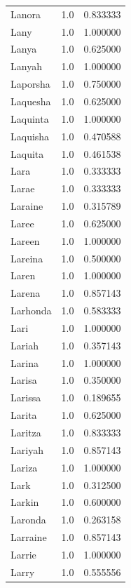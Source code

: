\documentclass[
  letterpaper,
  DIV=11,
  numbers=noendperiod]{scrreprt}
\begin{document}
\begin{tabular}{lrr}
Lanora          &   1.0 &   0.833333 \\
Lany            &   1.0 &   1.000000 \\
Lanya           &   1.0 &   0.625000 \\
Lanyah          &   1.0 &   1.000000 \\
Laporsha        &   1.0 &   0.750000 \\
Laquesha        &   1.0 &   0.625000 \\
Laquinta        &   1.0 &   1.000000 \\
Laquisha        &   1.0 &   0.470588 \\
Laquita         &   1.0 &   0.461538 \\
Lara            &   1.0 &   0.333333 \\
Larae           &   1.0 &   0.333333 \\
Laraine         &   1.0 &   0.315789 \\
Laree           &   1.0 &   0.625000 \\
Lareen          &   1.0 &   1.000000 \\
Lareina         &   1.0 &   0.500000 \\
Laren           &   1.0 &   1.000000 \\
Larena          &   1.0 &   0.857143 \\
Larhonda        &   1.0 &   0.583333 \\
Lari            &   1.0 &   1.000000 \\
Lariah          &   1.0 &   0.357143 \\
Larina          &   1.0 &   1.000000 \\
Larisa          &   1.0 &   0.350000 \\
Larissa         &   1.0 &   0.189655 \\
Larita          &   1.0 &   0.625000 \\
Laritza         &   1.0 &   0.833333 \\
Lariyah         &   1.0 &   0.857143 \\
Lariza          &   1.0 &   1.000000 \\
Lark            &   1.0 &   0.312500 \\
Larkin          &   1.0 &   0.600000 \\
Laronda         &   1.0 &   0.263158 \\
Larraine        &   1.0 &   0.857143 \\
Larrie          &   1.0 &   1.000000 \\
Larry           &   1.0 &   0.555556 \\

\end{tabular}
\end{document}
